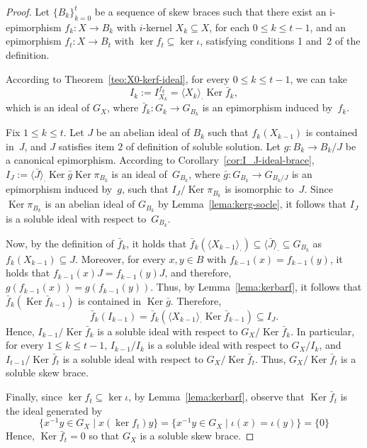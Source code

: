 \documentclass[12pt, a4paper, english]{article}
\theoremstyle{definition}
\theoremstyle{remark}
\DeclareMathOperator{\Ker}{Ker}
\newcommand{\bigcdot}{\boldsymbol{\cdot}}
\newcounter{cond}
\begin{document}
\begin{proof}
Let $\{B_k\}_{k=0}^t$ be a sequence of skew braces such that there exist an i-epimorphism $f_k \colon X \rightarrow B_k$ with $i$-kernel $X_k \subseteq X$, for each $0\leq k \leq t-1$, and an epimorphism $f_t\colon X \rightarrow B_t$ with $\ker f_t \subseteq \ker \iota$, satisfying conditions 1 and~2 of the definition.

According to Theorem~\ref{teo:X0-kerf-ideal}, for every $0\leq k \leq t-1$, we can take 
\[ I_k:= I_{X_k}^{f_k} = \langle X_k \rangle_{\bigcdot}\Ker \bar{f}_k,\]
which is an ideal of $G_X$, where $\bar f_k \colon G_k \rightarrow G_{B_k}$ is an epimorphism induced by~$f_k$.

Fix $1\leq k \leq t$. Let $J$ be an abelian ideal of $B_k$ such that $f_k(X_{k-1})$ is contained in~$J$, and $J$ satisfies item $2$ of definition of soluble solution. Let $g\colon B_k \rightarrow B_k/J$ be a canonical epimorphism. According to Corollary~\ref{cor:I_J-ideal-brace},  $I_J:= \langle \bar J\rangle_{\bigcdot}\Ker \bar{g} \Ker \pi_{B_k}$ is an ideal of~$G_{B_k}$, where $\bar{g}\colon G_{B_k}\rightarrow G_{B_k/J}$ is an epimorphism induced by~$g$, such that $I_J/\Ker\pi_{B_k}$ is isomorphic to~$J$. Since $\Ker \pi_{B_k}$ is an abelian ideal of $G_{B_k}$ by Lemma~\ref{lema:kerg-socle}, it follows that $I_J$ is a soluble ideal with respect to~$G_{B_k}$.

Now, by the definition of $\bar{f}_k$, it holds that $\bar{f}_k(\langle X_{k-1} \rangle_{\bigcdot}) \subseteq \langle \bar J \rangle_{\bigcdot} \subseteq G_{B_k}$ as $f_k(X_{k-1}) \subseteq J$. Moreover, for every $x,y\in B$ with $f_{k-1}(x) = f_{k-1}(y)$, it holds that $f_{k-1}(x)J = f_{k-1}(y)J$, and therefore, $g(f_{k-1}(x)) = g(f_{k-1}(y))$. Thus, by Lemma~\ref{lema:kerbarf}, 
it follows that $\bar{f}_{k}(\Ker \bar f_{k-1})$ is contained in $\Ker \bar g$. Therefore, 
\[ \bar f_k(I_{k-1}) = \bar f_k(\langle X_{k-1}\rangle_{\bigcdot}\Ker \bar f_{k-1})\subseteq I_J.\]
Hence, $I_{k-1}/\Ker \bar f_k$ is a soluble ideal with respect to $G_X/\Ker \bar f_k$. In particular, for every $1 \leq k \leq t-1$, $I_{k-1}/I_k$ is a soluble ideal with respect to $G_X/I_k$, and $I_{t-1}/\Ker \bar f_t$ is a soluble ideal with respect to $G_X/\Ker \bar f_t$. Thus, $G_X/\Ker \bar f_t$ is a soluble skew brace.

Finally, since $\ker f_t \subseteq \ker \iota$, by Lemma~\ref{lema:kerbarf}, observe that $\Ker \bar f_t$ is the ideal generated by 
\[ \{x^{-1}y\in G_X\mid x(\ker f_t) y\} = \{x^{-1}y\in G_X\mid \iota(x) = \iota(y)\} = \{0\}\]
Hence, $\Ker \bar f_t = 0$ so that $G_X$ is a soluble skew brace.
\end{proof}
\end{document}
